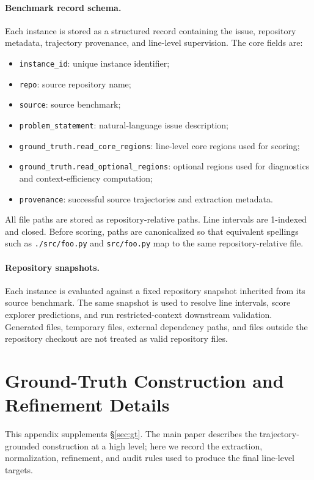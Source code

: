 \documentclass{llmxive}
\begin{document}
\paragraph{Benchmark record schema.}
Each instance is stored as a structured record containing the issue, repository
metadata, trajectory provenance, and line-level supervision. The core fields are:
\begin{itemize}
    \item \texttt{instance\_id}: unique instance identifier;
    \item \texttt{repo}: source repository name;
    \item \texttt{source}: source benchmark;
    \item \texttt{problem\_statement}: natural-language issue description;
    \item \texttt{ground\_truth.read\_core\_regions}: line-level core regions used for scoring;
    \item \texttt{ground\_truth.read\_optional\_regions}: optional regions used for diagnostics and context-efficiency computation;
    \item \texttt{provenance}: successful source trajectories and extraction metadata.
\end{itemize}
All file paths are stored as repository-relative paths. Line intervals are
1-indexed and closed. Before scoring, paths are canonicalized so that equivalent
spellings such as \texttt{./src/foo.py} and \texttt{src/foo.py} map to the same
repository-relative file.

\paragraph{Repository snapshots.}
Each instance is evaluated against a fixed repository snapshot inherited from
its source benchmark. The same snapshot is used to resolve line intervals, score
explorer predictions, and run restricted-context downstream validation.
Generated files, temporary files, external dependency paths, and files outside
the repository checkout are not treated as valid repository files.


\section{Ground-Truth Construction and Refinement Details}
\label{app:refine}
\label{app:gt_construction}

This appendix supplements \S\ref{sec:gt}. The main paper describes the
trajectory-grounded construction at a high level; here we record the extraction,
normalization, refinement, and audit rules used to produce the final line-level
targets.
\end{document}
